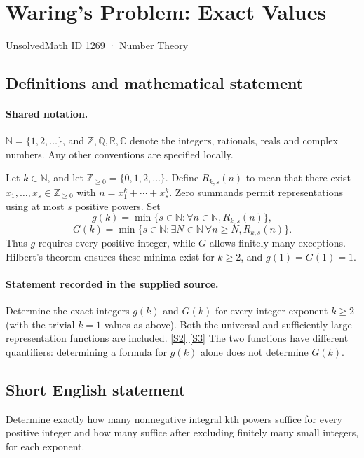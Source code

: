 \documentclass[11pt]{article}
\newcommand{\sref}[2]{\hyperlink{source:#1:#2}{[S#2]}}
\begin{document}
\setcounter{section}{1268}
\section{Waring's Problem: Exact Values}\label{1269}
{\small\sffamily UnsolvedMath ID 1269 · Number Theory}
\subsection{Definitions and mathematical statement}

\paragraph{Shared notation.}$\mathbb N=\{1,2,\ldots\}$, and $\mathbb Z,\mathbb Q,\mathbb R,\mathbb C$ denote the integers, rationals, reals and complex numbers. Any other conventions are specified locally.


Let $k\in\mathbb N$, and let $\mathbb Z_{\ge0}=\{0,1,2,\ldots\}$. Define $R_{k,s}(n)$ to mean that there exist $x_1,\ldots,x_s\in\mathbb Z_{\ge0}$ with $n=x_1^k+\cdots+x_s^k$. Zero summands permit representations using at most $s$ positive powers. Set
\[g(k)=\min\{s\in\mathbb N:\forall n\in\mathbb N, R_{k,s}(n)\},\]
\[G(k)=\min\{s\in\mathbb N:\exists N\in\mathbb N\ \forall n\ge N, R_{k,s}(n)\}.\]
Thus $g$ requires every positive integer, while $G$ allows finitely many exceptions. Hilbert's theorem ensures these minima exist for $k\ge2$, and $g(1)=G(1)=1$.
\paragraph{Statement recorded in the supplied source.}
Determine the exact integers $g(k)$ and $G(k)$ for every integer exponent $k\ge2$ (with the trivial $k=1$ values as above). Both the universal and sufficiently-large representation functions are included. \sref{1269}{2} \sref{1269}{3}
The two functions have different quantifiers: determining a formula for $g(k)$ alone does not determine $G(k)$.
\subsection{Short English statement}
Determine exactly how many nonnegative integral kth powers suffice for every positive integer and how many suffice after excluding finitely many small integers, for each exponent.
\end{document}
